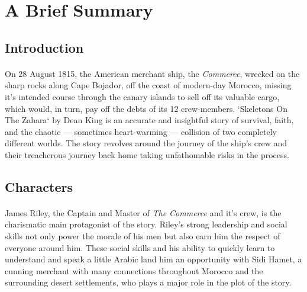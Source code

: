 %
%
%
%
% 


\pagestyle{empty} %

\newpage
\section*{A Brief Summary} 

\subsection*{Introduction}\paragraph{}
On 28 August 1815, the American merchant ship, the \textit{Commerce}, wrecked on the sharp rocks along Cape Bojador, off the coast of modern-day Morocco, missing it's intended course through the canary islands to sell off its valuable cargo, which would, in turn, pay off the debts of its 12 crew-members. `Skeletons On The Zahara` by Dean King is an accurate and insightful story of survival, faith, and the chaotic --- sometimes heart-warming --- collision of two completely different worlds. The story revolves around the journey of the ship's crew and their treacherous journey back home taking unfathomable risks in the process. 


\subsection*{Characters}
\paragraph{} 
James Riley, the Captain and Master of \textit{The Commerce} and it's crew, is the charismatic main protagonist of the story. Riley's strong leadership and social skills not only power the morale of his men but also earn him the respect of everyone around him. These social skills and his ability to quickly learn to understand and speak a little Arabic land him an opportunity with Sidi Hamet, a cunning merchant with many connections throughout Morocco and the surrounding desert settlements, who plays a major role in the plot of the story. 

